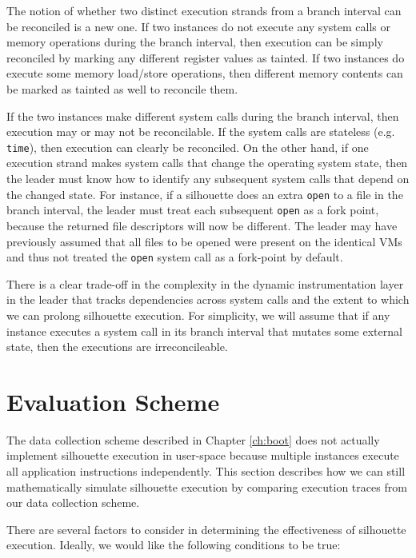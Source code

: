  \newline
The notion of whether two distinct execution strands 
from a branch interval can be reconciled is a new one.
If two instances do not execute
any system calls or memory operations
during the branch interval, then
execution can be simply reconciled
by marking any different register
values as tainted. If two instances
do execute some memory load/store
operations, then different
memory contents can be marked
as tainted as well to reconcile
them.

If the two instances make different system
calls during the branch interval, then execution may
or may not be reconcilable. 
If the system calls are stateless (e.g. \texttt{time}),
then execution can clearly be reconciled.
On the other hand, if one execution strand
makes system calls that change the operating
system state, then the leader must
know how to identify any subsequent
system calls that depend on the changed state.
For instance, if a silhouette does an
extra \texttt{open} to a
file in the branch interval, the leader
must treat each subsequent \texttt{open}
as a fork point, because
the returned file descriptors
will now be different. The
leader may have previously
assumed that all files to be opened were present
on the identical VMs and thus not
treated the \texttt{open} system call
as a fork-point by default.

There is a clear trade-off in the complexity
in the dynamic instrumentation layer in the leader that tracks
dependencies across system calls and
the extent to which we can 
prolong silhouette execution.
For simplicity, we will assume that
if any instance executes
a system call in its branch interval
that mutates some external state, then the executions
are irreconcileable.

\section{Evaluation Scheme} \label{silsimulation}
The data collection scheme described in Chapter \ref{ch:boot} does not
actually implement silhouette execution in user-space 
because multiple instances execute all application instructions independently.
This section describes how we can still mathematically simulate silhouette execution 
by comparing execution traces from our data collection scheme.

\newpage 
There are several factors
to consider in determining the effectiveness
of silhouette execution.
Ideally, we would like the following
conditions to be true:


